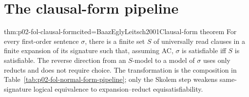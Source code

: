 \section{The clausal-form pipeline}
\label{sec:p02-fol-clausal-pipeline}

\begin{hbtheorem}{thm:p02-fol-clausal-form}{cited=BaazEglyLeitsch2001}{Clausal-form theorem}
For every first-order sentence \(\sigma\), there is a finite set \(S\) of
universally read clauses in a finite expansion of its signature such that,
assuming AC, \(\sigma\) is satisfiable iff \(S\) is satisfiable.  The reverse
direction from an \(S\)-model to a model of \(\sigma\) uses only reducts and
does not require choice.  The transformation is the composition in
Table~\ref{tab:p02-fol-normal-form-pipeline}; only the Skolem step weakens
same-signature logical equivalence to expansion--reduct equisatisfiability.
\end{hbtheorem}

